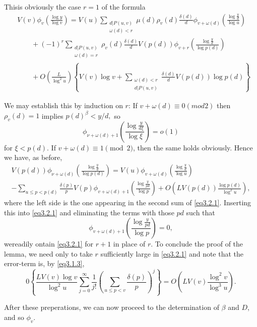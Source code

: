 This\pageoriginale is obviously the case $r=1$ of the formula
\begin{align*}
 & V(v)\phi_v \left(\frac{\log y}{\log v}\right) =V(u) \sum _{\substack
    {d|P(u,v)\\{\omega (d)<r}}}\mu (d)\rho_v
  (d)\frac{\delta(d)}{d}\phi_{v+\omega (d)} \left(\frac{\log
    \frac{y}{d}}{\log u}\right)\\
  &\qquad +(-1)^r \sum _{\substack {d|P(u,v)\\{\omega (d)=r}}} \rho_v
  (d)\frac{\delta(d)}{d} V(p(d))\phi_{v+r}\left(\frac{\log
    \frac{y}{d}}{\log p (d)}\right)\\ 
  &\qquad + O\left(\frac{L}{\log ^2 u}\right) \left\{ V(v) \log v+ \sum
  _{\substack {\omega (d)<r\\{d|P(u,v)}}}\frac{\delta(d)}{d} V(p(d)) \log p (d)
  \right\} \tag{3.2.1}\label{eq3.2.1}
\end{align*}

We may establish this by induction on $r$: If $v+ \omega (d)\equiv
0(mod 2)$ then $\rho_v (d)=1$ implies $p(d)^\beta < y/d,$ so 
$$
\phi_{\nu+\omega(d)+1}\left(\frac{\log \frac{y}{d \xi}}{\log 
  \xi}\right)=o(1) 
$$
for $\xi < p(d)$. If $v+\omega (d) \equiv 1 \pmod{2}$, then the same
holds obviously. Hence we have, as before, 
\begin{multline*}
  V(p(d)) \phi_{\nu + \omega (d)}\left(\frac{\log \frac{y}{d}}{\log p
  (d)}\right)=V(u)\phi_{v+ \omega (d)} \left(\frac{\log
  \frac{y}{d}}{\log u}\right)\\  
  - \sum_{u \le p < p(d)}\frac{\delta(p)}{p}V(p)\phi_{v+ \omega
  (d)+1}\left(\frac{\log \frac{y}{pd}}{\log p}\right)+ O\left(LV
  (p(d)) \frac{\log p(d)}{\log^2 u}\right), 
\end{multline*}
where the left side is the one appearing in the second sum of
\eqref{eq3.2.1}. Inserting this into \eqref{eq3.2.1} and eliminating
the terms with those $pd$ such that 
$$
\phi_{v+ \omega (d)+1}\left(\frac{\log \frac{y}{pd}}{\log p}\right)=0,
$$
we\pageoriginale readily ontain \eqref{eq3.2.1} for $r+1$ in place of
$r$. To conclude the 
proof of the lemma, we need only to take $r$ sufficiently large in
\eqref{eq3.2.1} and note that the error-term is, by \eqref{eq3.1.3}, 
$$
0\left\{ \frac{LV(v) \log v}{\log^2 u} \sum^ \infty _{j=0}
\frac{1}{j!}\left(\sum _{u \le p < v} \frac{\delta (p)}{p}\right)^j
\right\}= O\left(LV (v)\frac{\log^2 v}{\log^3 u}\right). 
$$

After these preperations, we can now proceed to the determination of
$\beta$ and $D$, and so $\phi_v$. 

